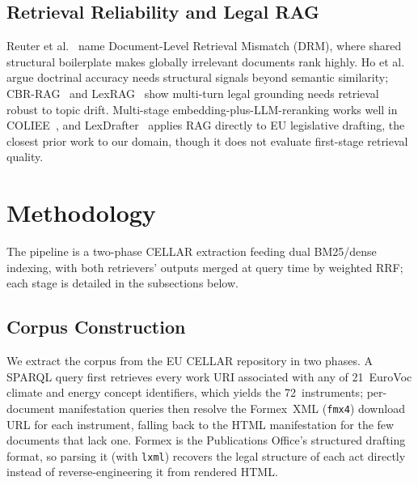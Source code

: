 \documentclass[conference,a4paper]{IEEEtran}
\begin{document}
\subsection{Retrieval Reliability and Legal RAG}

Reuter et al.~\cite{11} name Document-Level Retrieval Mismatch (DRM),
where shared structural boilerplate makes globally irrelevant
documents rank highly.
Ho et al.~\cite{12} argue doctrinal accuracy needs structural signals
beyond semantic similarity; CBR-RAG~\cite{5} and LexRAG~\cite{6} show
multi-turn legal grounding needs retrieval robust to topic drift.
Multi-stage embedding-plus-LLM-reranking works well in
COLIEE~\cite{10}, and LexDrafter~\cite{8} applies RAG directly to EU
legislative drafting, the closest prior work to our domain, though it
does not evaluate first-stage retrieval quality.

\section{Methodology}

The pipeline is a two-phase CELLAR extraction feeding dual BM25/dense
indexing, with both retrievers' outputs merged at query time by
weighted RRF; each stage is detailed in the subsections below.

\subsection{Corpus Construction}

We extract the corpus from the EU CELLAR repository in two phases.
A SPARQL query first retrieves every work URI associated with any of
21~EuroVoc climate and energy concept identifiers, which yields the
72~instruments; per-document manifestation queries then resolve the
Formex~XML (\texttt{fmx4}) download URL for each instrument, falling
back to the HTML manifestation for the few documents that lack one.
Formex is the Publications Office's structured drafting format, so
parsing it (with \texttt{lxml}) recovers the legal structure of each
act directly instead of reverse-engineering it from rendered HTML.
\end{document}
